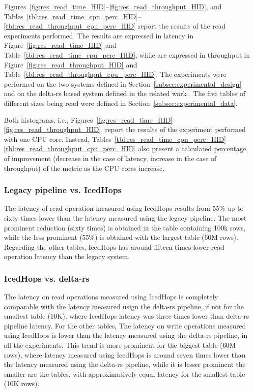 Figures~\ref{fig:res_read_time_HID}--\ref{fig:res_read_throughput_HID}, and Tables~\ref{tbl:res_read_time_cpu_perc_HID}--\ref{tbl:res_read_throughput_cpu_perc_HID} report the results of the read experiments performed. The results are expressed in latency in Figure~\ref{fig:res_read_time_HID} and Table~\ref{tbl:res_read_time_cpu_perc_HID}, while are expressed in throughput in Figure~\ref{fig:res_read_throughput_HID} and Table~\ref{tbl:res_read_throughput_cpu_perc_HID}. The experiments were performed on the two systems defined in Section~\ref{subsec:experimental_design} and on the delta-rs based system defined in the related work \cite{manfrediReducingReadWrite2024}. The five tables of different sizes being read were defined in Section~\ref{subsec:experimental_data}.

Both histograms, i.e., Figures~\ref{fig:res_read_time_HID}--\ref{fig:res_read_throughput_HID}, report the results of the experiment performed with one \gls{CPU} core. Instead, Tables~\ref{tbl:res_read_time_cpu_perc_HID}--\ref{tbl:res_read_throughput_cpu_perc_HID} also present a calculated percentage of improvement (decrease in the case of latency, increase in the case of throughput) of the metric as the \gls{CPU} cores increase.

\subsubsection*{Legacy pipeline vs. IcedHops}
The latency of read operation measured using IcedHops results from 55\% up to sixty times lower than the latency measured using the legacy pipeline. The most prominent reduction  (sixty times) is obtained in the table containing 100k rows, while the less prominent (55\%) is obtained with the largest table (60M rows). Regarding the other tables, IcedHops has around fifteen times lower read operation latency than the legacy system.

\subsubsection*{IcedHops vs. delta-rs}
The latency on read operations measured using IcedHops is completely comparable with the latency measured usign the delta-rs pipeline, if not for the smallest table (10K), where IcedHops latency was three times lower than delta-rs pipeline latency. For the other tables,
The latency on write operations measured using IcedHops is lower than the latency measured using the delta-rs pipeline, in all the experiments. This trend is more prominent for the biggest table (60M rows), where latency measured using IcedHops is around seven times lower than the latency measured using the delta-rs pipeline, while it is lesser prominent the smaller are the tables, with approximatively equal latency for the smallest table (10K rows).

